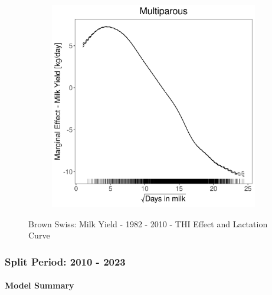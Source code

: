 \begin{figure}[H]
\begin{subfigure}[b]{0.45\textwidth}
    \end{subfigure}
    \hspace{0.05\textwidth} %
    \begin{subfigure}[b]{0.45\textwidth}
        \centering
        \includegraphics[width=\textwidth]{thesis/figures/models/milk/before2010/bs_milk_before2010/bs_milk_before2010_marginal_dim_milk_multi.png}
    \end{subfigure}
    \caption[]{Brown Swiss: Milk Yield - 1982 - 2010 - THI Effect and Lactation Curve}
    \label{fig:main}
\end{figure}

\subsubsection{Split Period: 2010 - 2023}\label{model:bs_milk_after}

\paragraph{Model Summary} \quad \\

